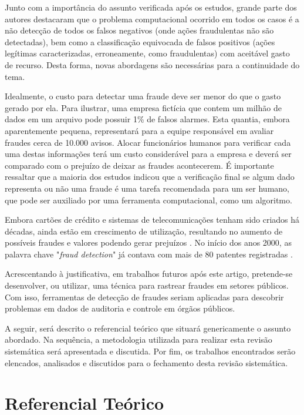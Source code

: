 \documentclass[smallextended]{svjour3}
\begin{document}
Junto com a importância do assunto verificada após os estudos, grande parte dos autores destacaram que o problema computacional ocorrido em todos os casos é a não detecção de todos os falsos negativos (onde ações fraudulentas não são detectadas), bem como a classificação equivocada de falsos positivos (ações legítimas caracterizadas, erroneamente, como fraudulentas) com aceitável gasto de recurso. Desta forma, novas abordagens são necessárias para a continuidade do tema.

Idealmente, o custo para detectar uma fraude deve ser menor do que o gasto gerado por ela. Para ilustrar, uma empresa fictícia que contem um milhão de dados em um arquivo pode possuir 1\% de falsos alarmes. Esta quantia, embora aparentemente pequena, representará para a equipe responsável em avaliar fraudes cerca de 10.000 avisos. Alocar funcionários humanos para verificar cada uma destas informações terá um custo considerável para a empresa e deverá ser comparado com o prejuízo de deixar as fraudes acontecerem. É importante ressaltar que a maioria dos estudos indicou que a verificação final se algum dado representa ou não uma fraude é uma tarefa recomendada para um ser humano, que pode ser auxiliado por uma ferramenta computacional, como um algoritmo. 

Embora cartões de crédito e sistemas de telecomunicações tenham sido criados há décadas, ainda estão em crescimento de utilização, resultando no aumento de possíveis fraudes e valores podendo gerar prejuízos \citep{Abdallah2016}. No início dos anos 2000, as palavra chave "\emph{fraud detection}" já contava com mais de 80 patentes registradas \citep{Bolton2002}.

Acrescentando à justificativa, em trabalhos futuros após este artigo, pretende-se desenvolver, ou utilizar, uma técnica para rastrear fraudes em setores públicos. Com isso, ferramentas de detecção de fraudes seriam aplicadas para descobrir problemas em dados de auditoria e controle em órgãos públicos.

A seguir, será descrito o referencial teórico que situará genericamente o assunto abordado. Na sequência, a metodologia utilizada para realizar esta revisão sistemática será apresentada e discutida. Por fim, os trabalhos encontrados serão elencados, analisados e discutidos para o fechamento desta revisão sistemática.

\section{Referencial Teórico}
\label{sec:2}
\end{document}
